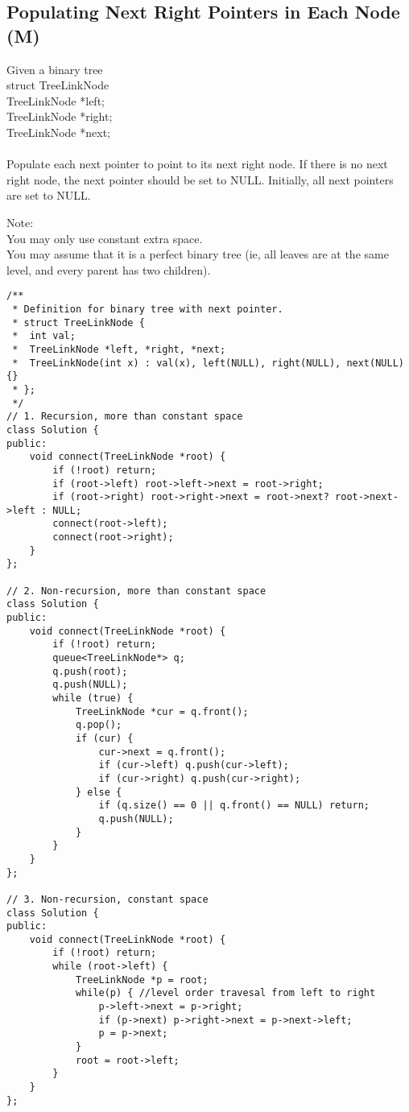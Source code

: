 \subsection{Populating Next Right Pointers in Each Node (M)}
Given a binary tree\\
    struct TreeLinkNode {\\
      TreeLinkNode *left;\\
      TreeLinkNode *right;\\
      TreeLinkNode *next;\\
    }\\

Populate each next pointer to point to its next right node. If there is no next right node, the next pointer should be set to NULL. Initially, all next pointers are set to NULL.\

Note:\\
    You may only use constant extra space.\\
    You may assume that it is a perfect binary tree (ie, all leaves are at the same level, and every parent has two children).\\
    
\begin{lstlisting}
/**
 * Definition for binary tree with next pointer.
 * struct TreeLinkNode {
 *  int val;
 *  TreeLinkNode *left, *right, *next;
 *  TreeLinkNode(int x) : val(x), left(NULL), right(NULL), next(NULL) {}
 * };
 */
// 1. Recursion, more than constant space
class Solution {
public:
    void connect(TreeLinkNode *root) {
        if (!root) return;
        if (root->left) root->left->next = root->right;
        if (root->right) root->right->next = root->next? root->next->left : NULL;
        connect(root->left);
        connect(root->right);
    }
};

// 2. Non-recursion, more than constant space
class Solution {
public:
    void connect(TreeLinkNode *root) {
        if (!root) return;
        queue<TreeLinkNode*> q;
        q.push(root);
        q.push(NULL);
        while (true) {
            TreeLinkNode *cur = q.front();
            q.pop();
            if (cur) {
                cur->next = q.front();
                if (cur->left) q.push(cur->left);
                if (cur->right) q.push(cur->right);
            } else {
                if (q.size() == 0 || q.front() == NULL) return;
                q.push(NULL);
            }
        }
    }
};

// 3. Non-recursion, constant space
class Solution {
public:
    void connect(TreeLinkNode *root) {
        if (!root) return;
        while (root->left) {
            TreeLinkNode *p = root;
            while(p) { //level order travesal from left to right
                p->left->next = p->right;
                if (p->next) p->right->next = p->next->left;
                p = p->next;
            }
            root = root->left;
        }
    }    
};
\end{lstlisting}


